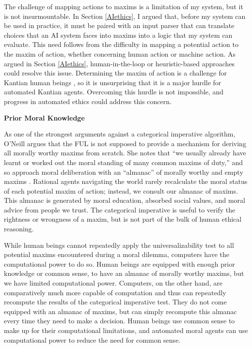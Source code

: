 \begin{isabellebody}
\begin{isamarkuptext}
The challenge of mapping actions to maxims is a limitation of my system, but it is not insurmountable. In Section \ref{AIethics},
I argued that, before my system can be used in practice, it must be paired with an input parser that can
translate choices that an AI system faces into maxims into a logic that my system can
evaluate. This need follows from the difficulty in mapping a potential action
to the maxim of action, whether concerning human action or machine action. As argued in Section \ref{AIethics},  
human-in-the-loop or heuristic-based approaches could resolve this issue. Determining the maxim of 
action is a challenge for Kantian human beings \citep{oneilluniversallaws}, so it is unsurprising that 
it is a major hurdle for automated Kantian agents. Overcoming this hurdle is not impossible, and progress
in automated ethics could address this concern.

\medskip 

\noindent \textbf{Prior Moral Knowledge}

As one of the strongest arguments against a categorical imperative algorithm, O'Neill argues that 
the FUL is not supposed to provide a mechanism for deriving all morally worthy maxims from scratch. She notes
that ``we usually already have learnt or worked out the moral standing of many common maxims of duty,''
and so approach moral deliberation with an ``almanac'' of morally worthy and empty maxims \citep[394]{oneilluniversallaws}. 
Rational agents navigating the world rarely recalculate the moral status of each potential maxim of 
action; instead, we consult our almanac of maxims. This almanac is generated by moral education, 
absorbed social values, and moral advice from people we trust. The categorical imperative is useful 
to verify the rightness or wrongness of a maxim, but is not part of the bulk of human ethical reasoning.

While human beings cannot repeatedly apply the universalizability test to all potential maxims encountered during 
a moral dilemma, computers have the computational power to do so. Human beings are 
equipped with enough prior knowledge or common sense, to have an almanac of morally worthy maxims,
but we have limited computational power. Computers, on the other hand, are comparatively
much more capable of computation and thus can repeatedly recompute the results of the categorical
imperative test. They do not come equipped with an almanac of maxims, but can simply recompute this
almanac every time they need to make a decision. Human beings use common sense to make up for their computational
limitations, and automated moral agents can use computational power to reduce the need for common sense.


\end{isamarkuptext}
\end{isabellebody}
